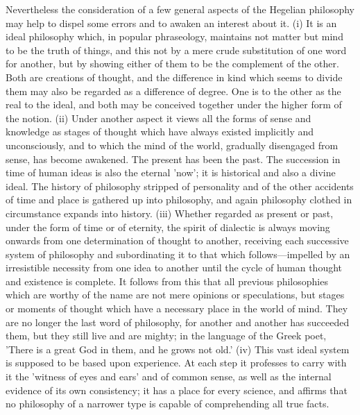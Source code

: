 \documentclass[11pt,letter]{article}
\begin{document}
\par  Nevertheless the consideration of a few general aspects of the Hegelian philosophy may help to dispel some errors and to awaken an interest about it. (i) It is an ideal philosophy which, in popular phraseology, maintains not matter but mind to be the truth of things, and this not by a mere crude substitution of one word for another, but by showing either of them to be the complement of the other. Both are creations of thought, and the difference in kind which seems to divide them may also be regarded as a difference of degree. One is to the other as the real to the ideal, and both may be conceived together under the higher form of the notion. (ii) Under another aspect it views all the forms of sense and knowledge as stages of thought which have always existed implicitly and unconsciously, and to which the mind of the world, gradually disengaged from sense, has become awakened. The present has been the past. The succession in time of human ideas is also the eternal 'now'; it is historical and also a divine ideal. The history of philosophy stripped of personality and of the other accidents of time and place is gathered up into philosophy, and again philosophy clothed in circumstance expands into history. (iii) Whether regarded as present or past, under the form of time or of eternity, the spirit of dialectic is always moving onwards from one determination of thought to another, receiving each successive system of philosophy and subordinating it to that which follows—impelled by an irresistible necessity from one idea to another until the cycle of human thought and existence is complete. It follows from this that all previous philosophies which are worthy of the name are not mere opinions or speculations, but stages or moments of thought which have a necessary place in the world of mind. They are no longer the last word of philosophy, for another and another has succeeded them, but they still live and are mighty; in the language of the Greek poet, 'There is a great God in them, and he grows not old.' (iv) This vast ideal system is supposed to be based upon experience. At each step it professes to carry with it the 'witness of eyes and ears' and of common sense, as well as the internal evidence of its own consistency; it has a place for every science, and affirms that no philosophy of a narrower type is capable of comprehending all true facts.
\end{document}
